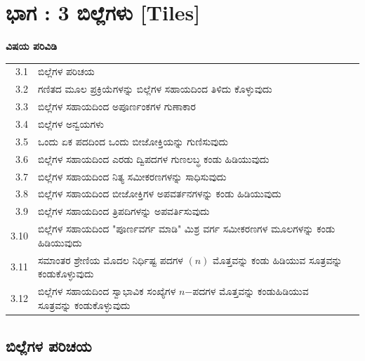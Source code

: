 

\chapter{ಭಾಗ : 3 ಬಿಲ್ಲೆಗಳು [Tiles] }\label{chap3}

\textbf{\Large ವಿಷಯ ಪರಿವಿಡಿ}

\medskip
\medskip

{\renewcommand{\arraystretch}{1.2}
\begin{longtable}[l]{@{}>{}r>{\raggedright}p{9.1cm}>{}r@{}}
\hline
3.1 & ಬಿಲ್ಲೆಗಳ ಪರಿಚಯ \dotfill & \pageref{sec3.1}\\
3.2 & ಗಣಿತದ ಮೂಲ ಪ್ರಕ್ರಿಯೆಗಳನ್ನು ಬಿಲ್ಲೆಗಳ ಸಹಾಯದಿಂದ ತಿಳಿದು ಕೊಳ್ಳುವುದು \dotfill & \raisebox{-0.55cm}{\pageref{sec3.2}}\\
3.3 & ಬಿಲ್ಲೆಗಳ ಸಹಾಯದಿಂದ ಅಪೂರ್ಣಂಕಗಳ ಗುಣಾಕಾರ \dotfill & \pageref{sec3.3}\\
3.4 & ಬಿಲ್ಲೆಗಳ ಅನ್ವಯಗಳು \dotfill  & \pageref{sec3.4}\\
3.5 & ಒಂದು ಏಕ ಪದದಿಂದ ಒಂದು ಬೀಜೋಕ್ತಿಯನ್ನು ಗುಣಿಸುವುದು \dotfill & \pageref{sec3.5}\\
3.6 & ಬಿಲ್ಲೆಗಳ ಸಹಾಯದಿಂದ ಎರಡು ದ್ವಿಪದಗಳ ಗುಣಲಬ್ಧ ಕಂಡು ಹಿಡಿಯುವುದು  \dotfill & \raisebox{-0.55cm}{\pageref{sec3.6}}\\
3.7 & ಬಿಲ್ಲೆಗಳ ಸಹಾಯದಿಂದ ನಿತ್ಯ ಸಮೀಕರಣಗಳನ್ನು ಸಾಧಿಸುವುದು  \dotfill & \pageref{sec3.7}\\
3.8 & ಬಿಲ್ಲೆಗಳ ಸಹಾಯದಿಂದ ಬೀಜೋಕ್ತಿಗಳ ಅಪವರ್ತನಗಳನ್ನು ಕಂಡು ಹಿಡಿಯುವುದು \dotfill & \raisebox{-0.55cm}{\pageref{sec3.8}}\\
3.9 & ಬಿಲ್ಲೆಗಳ ಸಹಾಯದಿಂದ ತ್ರಿಪದಿಗಳನ್ನು ಅಪವರ್ತಿಸುವುದು \dotfill & \pageref{sec3.9}\\
3.10 & ಬಿಲ್ಲೆಗಳ ಸಹಾಯದಿಂದ "ಪೂರ್ಣವರ್ಗ ಮಾಡಿ" ಮಿಶ್ರ ವರ್ಗ ಸಮೀಕರಣಗಳ ಮೂಲಗಳನ್ನು ಕಂಡು ಹಿಡಿಯುವುದು \dotfill & \raisebox{-0.55cm}{\pageref{sec3.10}}\\
3.11 &  ಸಮಾಂತರ ಶ್ರೇಣಿಯ ಮೊದಲ ನಿರ್ಧಿಷ್ಟ ಪದಗಳ $(n)$ ಮೊತ್ತವನ್ನು ಕಂಡು ಹಿಡಿಯುವ ಸೂತ್ರವನ್ನು ಕಂಡುಕೊಳ್ಳುವುದು \dotfill & \raisebox{-0.55cm}{\pageref{sec3.11}}\\
3.12 & ಬಿಲ್ಲೆಗಳ ಸಹಾಯದಿಂದ ಸ್ವಾಭಾವಿಕ ಸಂಖ್ಯೆಗಳ $n$$-$ಪದಗಳ ಮೊತ್ತವನ್ನು ಕಂಡುಹಿಡಿಯುವ ಸೂತ್ರವನ್ನು ಕಂಡುಕೊಳ್ಳುವುದು \dotfill & \raisebox{-0.55cm}{\pageref{sec3.12}}\\[0.5cm]
\hline
\end{longtable}}\relax

\bigskip

\section{ಬಿಲ್ಲೆಗಳ ಪರಿಚಯ}\label{sec3.1}%

